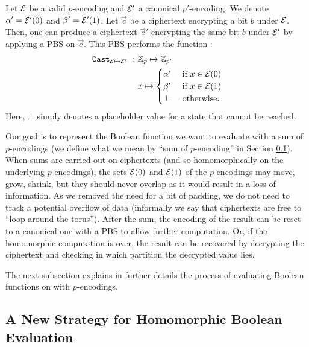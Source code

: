 \begin{property} 
    \label{prop:cast_valid_to_canonical}
    Let $\mathcal{E}$ be a valid $p$-encoding and $\mathcal{E}'$ a canonical $p'$-encoding. We denote $\alpha' = \mathcal{E}'(0)$ and $\beta' = \mathcal{E}'(1)$. Let $\vec c$ be a ciphertext encrypting a bit $b$ under $\mathcal{E}$. Then, one can produce a ciphertext $\vec c'$ encrypting the same bit $b$ under $\mathcal{E}'$ by applying a PBS on $\vec c$. This PBS performs the function :
    \[
        \begin{aligned}
            \texttt{Cast}_{\mathcal{E} \mapsto \mathcal{E}'}~:~& \mathbb{Z}_p \mapsto \mathbb{Z}_{p'}\\
            & x \mapsto \begin{cases}
                            \alpha' & \text{ if } x \in \mathcal{E}(0)\\
                            \beta' & \text{ if } x \in \mathcal{E}(1)\\
                            \bot & \text{ otherwise.}
                        \end{cases}
        \end{aligned}
    \]
    Here, $\bot$ simply denotes a placeholder value for a state that cannot be reached.
\end{property}



Our goal is to represent the Boolean function we want to evaluate with a sum of $p$-encodings (we define what we mean by ``sum of $p$-encoding'' in Section \ref{sec:p_encodings_new_strategy}).  When sums are carried out on ciphertexts (and so homomorphically on the underlying $p$-encodings), the sets $\mathcal{E}(0)$ and $\mathcal{E}(1)$ of the $p$-encodings may move, grow, shrink, but they should never overlap as it would result in a loss of information. As we removed the need for a bit of padding, we do not need to track a potential overflow of data (informally we say that ciphertexts are free to ``loop around the torus''). After the sum, the encoding of the result can be reset to a canonical one with a PBS to allow further computation. Or, if the homomorphic computation is over, the result can be recovered by decrypting the ciphertext and checking in which partition the decrypted value lies.


The next subsection explains in further details the process of evaluating Boolean functions on with $p$-encodings.



\subsection{A New Strategy for Homomorphic Boolean Evaluation}
\label{sec:p_encodings_new_strategy}




